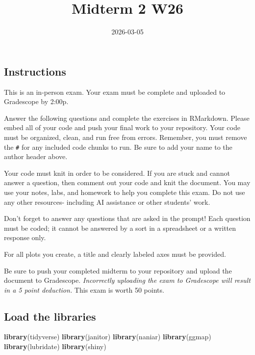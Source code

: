 \documentclass[
]{article}
\title{Midterm 2 W26}
\author{}
\date{\vspace{-2.5em}2026-03-05}
\newenvironment{Shaded}{\begin{snugshade}}{\end{snugshade}}
\newcommand{\FunctionTok}[1]{\textcolor[rgb]{0.13,0.29,0.53}{\textbf{#1}}}
\newcommand{\NormalTok}[1]{#1}
\begin{document}
\maketitle

\subsection{Instructions}\label{instructions}

This is an in-person exam. Your exam must be complete and uploaded to
Gradescope by 2:00p.

Answer the following questions and complete the exercises in RMarkdown.
Please embed all of your code and push your final work to your
repository. Your code must be organized, clean, and run free from
errors. Remember, you must remove the \texttt{\#} for any included code
chunks to run. Be sure to add your name to the author header above.

Your code must knit in order to be considered. If you are stuck and
cannot answer a question, then comment out your code and knit the
document. You may use your notes, labs, and homework to help you
complete this exam. Do not use any other resources- including AI
assistance or other students' work.

Don't forget to answer any questions that are asked in the prompt! Each
question must be coded; it cannot be answered by a sort in a spreadsheet
or a written response only.

For all plots you create, a title and clearly labeled axes must be
provided.

Be sure to push your completed midterm to your repository and upload the
document to Gradescope. \emph{Incorrectly uploading the exam to
Gradescope will result in a 5 point deduction.} This exam is worth 50
points.

\subsection{Load the libraries}\label{load-the-libraries}

\begin{Shaded}
\begin{Highlighting}[]
\FunctionTok{library}\NormalTok{(tidyverse)}
\FunctionTok{library}\NormalTok{(janitor)}
\FunctionTok{library}\NormalTok{(naniar)}
\FunctionTok{library}\NormalTok{(ggmap)}
\FunctionTok{library}\NormalTok{(lubridate)}
\FunctionTok{library}\NormalTok{(shiny)}
\end{Highlighting}
\end{Shaded}
\end{document}
